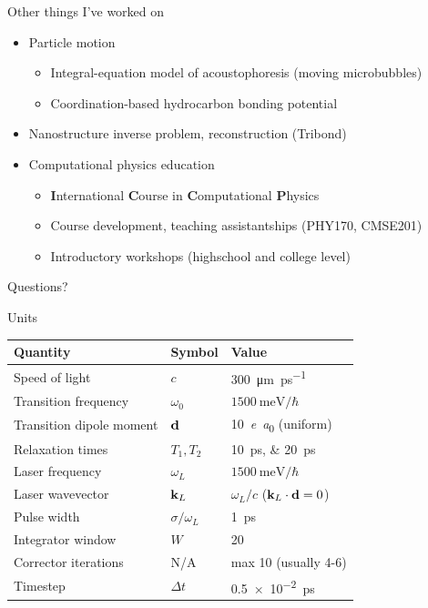 \documentclass[aspectratio=169, usenames, dvipsnames]{beamer}
\begin{document}
\begin{frame}{Other things I've worked on}
  \begin{itemize}
    \item[] Particle motion
      \begin{itemize}
        \item Integral-equation model of acoustophoresis (moving microbubbles)
        \item Coordination-based hydrocarbon bonding potential
      \end{itemize}
    \item[] Nanostructure inverse problem, reconstruction (Tribond)
    \item[] Computational physics education
      \begin{itemize}
        \item \textbf{I}nternational \textbf{C}ourse in \textbf{C}omputational \textbf{P}hysics
        \item Course development, teaching assistantships (PHY170, CMSE201)
        \item Introductory workshops (highschool and college level)
      \end{itemize}
  \end{itemize}
\end{frame}
\appendix

\begin{frame}[standout]
  Questions?
\end{frame}

\begin{frame}{Units}
  \begin{table}
    \begin{tabular}{lll}
      Quantity                 & Symbol            & Value                        \\ \hline \hline
      Speed of light           & $c$               & \SI{300}{\micro\meter \per \pico\second} \\
      Transition frequency     & $\omega_0$        & $\SI{1500}{\milli\eV}/\hbar$ \\
      Transition dipole moment & $\vb{d}$          & \SI{10}{\elementarycharge\bohr} (uniform) \\
      Relaxation times         & $T_{1}, T_{2}$    & \SIlist{10;20}{\pico\second} \\
      Laser frequency          & $\omega_L$        & $\SI{1500}{\milli\eV}/\hbar$ \\
      Laser wavevector         & $\vb{k}_L$        & $\omega_L/c$ ($\vb{k}_L \cdot \vb{d} = 0$) \\
      Pulse width              & $\sigma/\omega_L$ & \SI{1}{\pico\second} \\ \hline
      Integrator window        & $W$               & 20 \\
      Corrector iterations     & N/A               & max 10 (usually 4-6) \\
      Timestep                 & $\Delta t$        & \SI{0.5e-2}{\pico\second}
    \end{tabular}
  \end{table}
\end{frame}
\end{document}
